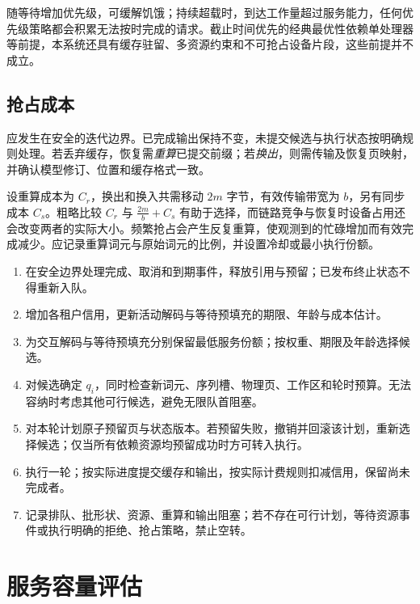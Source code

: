 \documentclass[../textbook.tex]{subfiles}
\begin{document}
随等待增加优先级，可缓解饥饿；持续超载时，到达工作量超过服务能力，任何优先级策略都会积累无法按时完成的请求。截止时间优先的经典最优性依赖单处理器等前提，本系统还具有缓存驻留、多资源约束和不可抢占设备片段，这些前提并不成立。

\subsection{抢占成本}
应发生在安全的迭代边界。已完成输出保持不变，未提交候选与执行状态按明确规则处理。若丢弃缓存，恢复需\emph{重算}已提交前缀；若\emph{换出}，则需传输及恢复页映射，并确认模型修订、位置和缓存格式一致。

设重算成本为 $C_r$，换出和换入共需移动 $2m$ 字节，有效传输带宽为 $b$，另有同步成本 $C_s$。粗略比较 $C_r$ 与 $\frac{2m}{b}+C_s$ 有助于选择，而链路竞争与恢复时设备占用还会改变两者的实际大小。频繁抢占会产生反复重算，使观测到的忙碌增加而有效完成减少。应记录重算词元与原始词元的比例，并设置冷却或最小执行份额。

\begin{algorithm}[单轮有界调度]
\begin{enumerate}
\item 在安全边界处理完成、取消和到期事件，释放引用与预留；已发布终止状态不得重新入队。
\item 增加各租户信用，更新活动解码与等待预填充的期限、年龄与成本估计。
\item 为交互解码与等待预填充分别保留最低服务份额；按权重、期限及年龄选择候选。
\item 对候选确定 $q_i$，同时检查新词元、序列槽、物理页、工作区和轮时预算。无法容纳时考虑其他可行候选，避免无限队首阻塞。
\item 对本轮计划原子预留页与状态版本。若预留失败，撤销并回滚该计划，重新选择候选；仅当所有依赖资源均预留成功时方可转入执行。
\item 执行一轮；按实际进度提交缓存和输出，按实际计费规则扣减信用，保留尚未完成者。
\item 记录排队、批形状、资源、重算和输出阻塞；若不存在可行计划，等待资源事件或执行明确的拒绝、抢占策略，禁止空转。
\end{enumerate}
\end{algorithm}

\section{服务容量评估}
\end{document}
